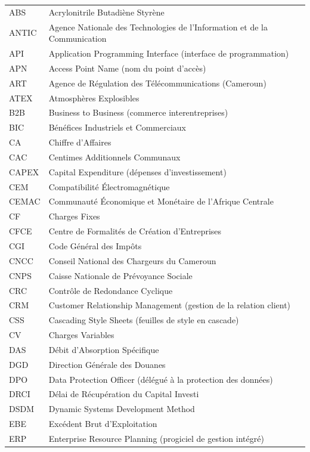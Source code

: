 \begin{longtable}{@{}p{3.2cm}p{11.4cm}@{}}
	ABS & Acrylonitrile Butadiène Styrène \\
	ANTIC & Agence Nationale des Technologies de l'Information et de la Communication \\
	API & Application Programming Interface (interface de programmation) \\
	APN & Access Point Name (nom du point d'accès) \\
	ART & Agence de Régulation des Télécommunications (Cameroun) \\
	ATEX & Atmosphères Explosibles \\
	B2B & Business to Business (commerce interentreprises) \\
	BIC & Bénéfices Industriels et Commerciaux \\
	CA & Chiffre d'Affaires \\
	CAC & Centimes Additionnels Communaux \\
	CAPEX & Capital Expenditure (dépenses d'investissement) \\
	CEM & Compatibilité Électromagnétique \\
	CEMAC & Communauté Économique et Monétaire de l'Afrique Centrale \\
	CF & Charges Fixes \\
	CFCE & Centre de Formalités de Création d'Entreprises \\
	CGI & Code Général des Impôts \\
	CNCC & Conseil National des Chargeurs du Cameroun \\
	CNPS & Caisse Nationale de Prévoyance Sociale \\
	CRC & Contrôle de Redondance Cyclique \\
	CRM & Customer Relationship Management (gestion de la relation client) \\
	CSS & Cascading Style Sheets (feuilles de style en cascade) \\
	CV & Charges Variables \\
	DAS & Débit d'Absorption Spécifique \\
	DGD & Direction Générale des Douanes \\
	DPO & Data Protection Officer (délégué à la protection des données) \\
	DRCI & Délai de Récupération du Capital Investi \\
	DSDM & Dynamic Systems Development Method \\
	EBE & Excédent Brut d'Exploitation \\
	ERP & Enterprise Resource Planning (progiciel de gestion intégré) \\

\end{longtable}
